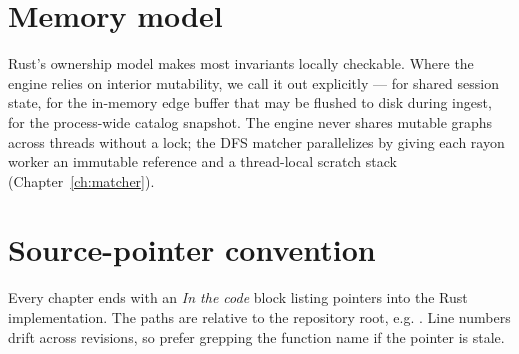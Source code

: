\section{Memory model}

Rust's ownership model makes most invariants locally checkable.
Where the engine relies on interior mutability, we call it out
explicitly ---  for shared session state,
 for the in-memory edge buffer
that may be flushed to disk during ingest,  for the
process-wide catalog snapshot. The engine never shares mutable
graphs across threads without a lock; the DFS matcher
parallelizes by giving each rayon worker an immutable reference and
a thread-local scratch stack (Chapter~\ref{ch:matcher}).

\section{Source-pointer convention}

Every chapter ends with an \emph{In the code} block listing
 pointers into the Rust implementation. The paths
are relative to the repository root, e.g.
. Line numbers drift
across revisions, so prefer grepping the function name if the
pointer is stale.
